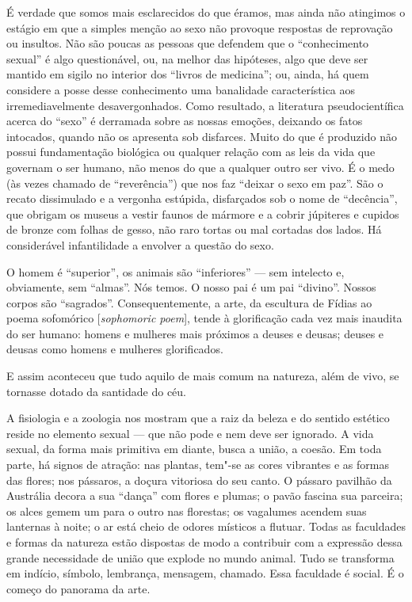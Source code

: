 É verdade que somos mais esclarecidos do que éramos, mas ainda não
atingimos o estágio em que a simples menção ao sexo não provoque
respostas de reprovação ou insultos. Não são poucas as pessoas que
defendem que o ``conhecimento sexual'' é algo questionável, ou, na
melhor das hipóteses, algo que deve ser mantido em sigilo no interior
dos ``livros de medicina''; ou, ainda, há quem considere a posse desse
conhecimento uma banalidade característica aos irremediavelmente
desavergonhados. Como resultado, a literatura pseudocientífica acerca do
``sexo'' é derramada sobre as nossas emoções, deixando os fatos
intocados, quando não os apresenta sob disfarces. Muito do que é
produzido não possui fundamentação biológica ou qualquer relação com as
leis da vida que governam o ser humano, não menos do que a qualquer outro ser
vivo. É o medo (às vezes chamado de ``reverência'') que nos faz ``deixar
o sexo em paz''. São o recato dissimulado e a vergonha estúpida,
disfarçados sob o nome de ``decência'', que obrigam os museus a vestir
faunos de mármore e a cobrir júpiteres e cupidos de bronze com folhas de
gesso, não raro tortas ou mal cortadas dos lados. Há considerável
infantilidade a envolver a questão do sexo.

O homem é ``superior'', os animais são ``inferiores'' --- sem intelecto
e, obviamente, sem ``almas''. Nós temos. O nosso pai é um pai
``divino''. Nossos corpos são ``sagrados''. Consequentemente, a arte, da
escultura de Fídias ao poema sofomórico {[}\emph{sophomoric poem}{]},
tende à glorificação cada vez mais inaudita do ser humano: homens e mulheres
mais próximos a deuses e deusas; deuses e deusas como homens e mulheres
glorificados.

E assim aconteceu que tudo aquilo de mais comum na natureza, além de
vivo, se tornasse dotado da santidade do céu.


A fisiologia e a zoologia nos mostram que a raiz da beleza e do sentido
estético reside no elemento sexual --- que não pode e nem deve ser
ignorado. A vida sexual, da forma mais primitiva em diante, busca a
união, a coesão. Em toda parte, há signos de atração: nas plantas,
tem"-se as cores vibrantes e as formas das flores; nos pássaros, a doçura
vitoriosa do seu canto. O pássaro pavilhão da Austrália decora a sua
``dança'' com flores e plumas; o pavão fascina sua parceira; os alces
gemem um para o outro nas florestas; os vagalumes acendem suas lanternas
à noite; o ar está cheio de odores místicos a flutuar. Todas as
faculdades e formas da natureza estão dispostas de modo a contribuir com
a expressão dessa grande necessidade de união que explode no mundo
animal. Tudo se transforma em indício, símbolo, lembrança, mensagem,
chamado. Essa faculdade é social. É o começo do panorama da arte.

